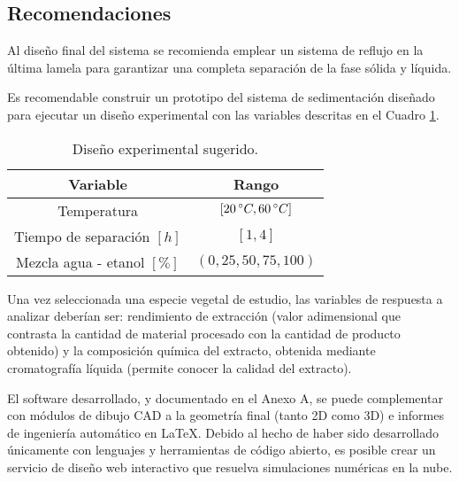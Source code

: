 \begin{center}
	\section{Recomendaciones}
\end{center}

\noindent
\justify

Al dise\~no final del sistema se recomienda emplear un sistema de reflujo en la \'ultima lamela para garantizar una completa separaci\'on de la fase s\'olida y l\'iquida.

\noindent
\justify

Es recomendable construir un prototipo del sistema de sedimentaci\'on dise\~nado para ejecutar un dise\~no experimental con las variables descritas en el Cuadro \ref{exps}.

\begin{table}[h!]
	\centering
	\begin{tabular}{|c|c|}
		\hline
		\textbf{Variable} & \textbf{Rango} \\ \hline
		Temperatura & $[20 \, \degree C, 60 \, \degree C]$ \\ \hline
		Tiempo de separaci\'on $[h]$ & $[1, 4]$ \\ \hline
		Mezcla agua - etanol $[\% ]$ & $(0,25,50,75,100)$ \\ \hline
	\end{tabular}
	\caption{Dise\~no experimental sugerido.}
	\label{exps}
\end{table}

\noindent
\justify

Una vez seleccionada una especie vegetal de estudio, las variables de respuesta a analizar deber\'ian ser: rendimiento de extracci\'on (valor adimensional que contrasta la cantidad de material procesado con la cantidad de producto obtenido) y la composici\'on qu\'imica del extracto, obtenida mediante cromatograf\'ia l\'iquida (permite conocer la calidad del extracto).

\noindent
\justify

El software desarrollado, y documentado en el Anexo A, se puede complementar con m\'odulos de dibujo CAD a la geometr\'ia final (tanto 2D como 3D) e informes de ingenier\'ia autom\'atico en \LaTeX. Debido al hecho de haber sido desarrollado \'unicamente con lenguajes y herramientas de c\'odigo abierto, es posible crear un servicio de dise\~no web interactivo que resuelva simulaciones num\'ericas en la nube.